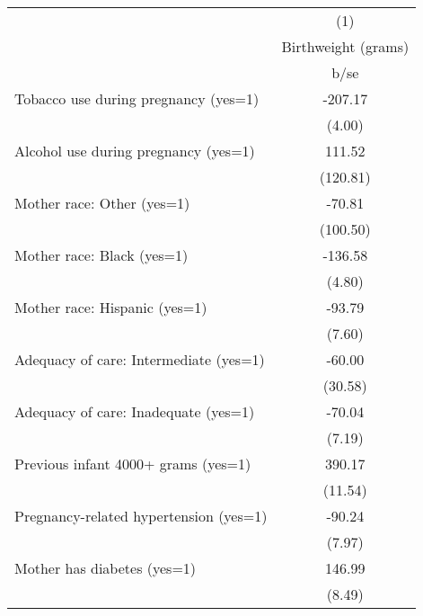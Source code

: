 {
\def\sym#1{\ifmmode^{#1}\else\(^{#1}\)\fi}
\begin{tabular}{l*{1}{c}}
\hline\hline
                                                  &\multicolumn{1}{c}{(1)}\\
                                                  &\multicolumn{1}{c}{Birthweight (grams)}\\
                                                  &        b/se\\
\hline
Tobacco use during pregnancy (yes=1)              &     -207.17\\
                                                  &      (4.00)\\
Alcohol use during pregnancy (yes=1)              &      111.52\\
                                                  &    (120.81)\\
Mother race: Other (yes=1)                        &      -70.81\\
                                                  &    (100.50)\\
Mother race: Black (yes=1)                        &     -136.58\\
                                                  &      (4.80)\\
Mother race: Hispanic (yes=1)                     &      -93.79\\
                                                  &      (7.60)\\
Adequacy of care: Intermediate (yes=1)            &      -60.00\\
                                                  &     (30.58)\\
Adequacy of care: Inadequate (yes=1)              &      -70.04\\
                                                  &      (7.19)\\
Previous infant 4000+ grams (yes=1)               &      390.17\\
                                                  &     (11.54)\\
Pregnancy-related hypertension (yes=1)            &      -90.24\\
                                                  &      (7.97)\\
Mother has diabetes (yes=1)                       &      146.99\\
                                                  &      (8.49)\\

\end{tabular}}
